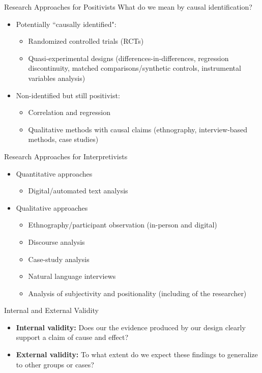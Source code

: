 \documentclass{beamer}
\begin{document}
\begin{frame}{Research Approaches for Positivists}
What do we mean by causal identification? 
\begin{itemize}
    \item Potentially ``causally identified": 
    \begin{itemize}
        \item Randomized controlled trials (RCTs)
        \item Quasi-experimental designs (differences-in-differences, regression discontinuity, matched comparisons/synthetic controls, instrumental variables analysis) 
    \end{itemize}
    \item Non-identified but still positivist:
    \begin{itemize}
        \item Correlation and regression 
        \item Qualitative methods with causal claims (ethnography, interview-based methods, case studies) 
    \end{itemize}
\end{itemize}
    
\end{frame}

\begin{frame}{Research Approaches for Interpretivists}
\begin{itemize}
    \item Quantitative approaches
    \begin{itemize}
        \item Digital/automated text analysis 
    \end{itemize}
    \item Qualitative approaches
    \begin{itemize}
    \item Ethnography/participant observation (in-person and digital) 
    \item Discourse analysis 
    \item Case-study analysis  
    \item Natural language interviews  
    \item Analysis of subjectivity and positionality (including of the researcher) 
    \end{itemize}
\end{itemize}
    
\end{frame}


\begin{frame}{Internal and External Validity}
\begin{itemize}
    \item \textbf{Internal validity:} Does our the evidence produced by our design clearly support a claim of cause and effect? 
    \item \textbf{External validity:} To what extent do we expect these findings to generalize to other groups or cases? 
\end{itemize}
\end{frame} 
\end{document}
